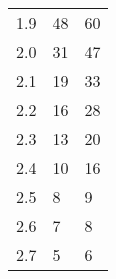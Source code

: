 \begin{table}[H]
{\begin{tabular}{|l|l|l|}
1.9                      & 48                                                                                                                   & 60                                                                                                                     \\
2.0                      & 31                                                                                                                   & 47                                                                                                                     \\
2.1                      & 19                                                                                                                   & 33                                                                                                                     \\
2.2                      & 16                                                                                                                   & 28                                                                                                                     \\
2.3                      & 13                                                                                                                   & 20                                                                                                                     \\
2.4                      & 10                                                                                                                   & 16                                                                                                                     \\
2.5                      & 8                                                                                                                    & 9                                                                                                                      \\
2.6                      & 7                                                                                                                    & 8                                                                                                                      \\
2.7                      & 5                                                                                                                    & 6                                                                                                                      \\

\end{tabular}}
\end{table}
